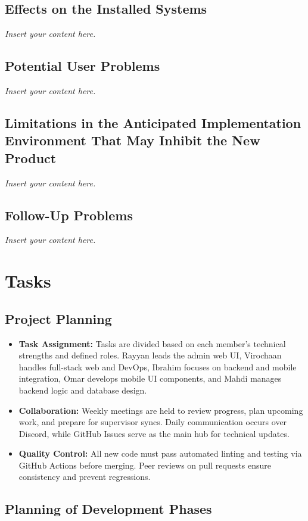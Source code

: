 \documentclass[12pt]{article}
\newcommand{\lips}{\textit{Insert your content here.}}
\begin{document}
\subsection{Effects on the Installed Systems}
\lips
\subsection{Potential User Problems}
\lips
\subsection{Limitations in the Anticipated Implementation Environment That May
Inhibit the New Product}
\lips
\subsection{Follow-Up Problems}
\lips

\section{Tasks}
\subsection{Project Planning }

\begin{itemize}
    \item \textbf{Task Assignment:} Tasks are divided based on each member’s technical strengths and defined roles.  
    Rayyan leads the admin web UI, Virochaan handles full-stack web and DevOps, Ibrahim focuses on backend and mobile integration, Omar develops mobile UI components, and Mahdi manages backend logic and database design.
    \item \textbf{Collaboration:} Weekly meetings are held to review progress, plan upcoming work, and prepare for supervisor syncs.  
    Daily communication occurs over Discord, while GitHub Issues serve as the main hub for technical updates.
    \item \textbf{Quality Control:} All new code must pass automated linting and testing via GitHub Actions before merging.  
    Peer reviews on pull requests ensure consistency and prevent regressions.
\end{itemize}

\subsection{Planning of Development Phases}
\end{document}
